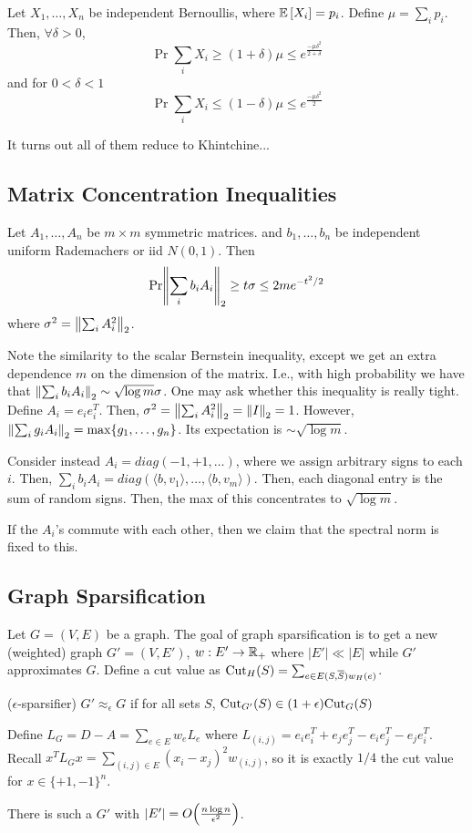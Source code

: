\begin{theorem}[Chernoff]
    Let $X_1, \dots, X_n$ be independent Bernoullis, where $\mathbb{E}\left[ X_i \right] = p_i$. Define $\mu = \sum_i p_i$.
    Then, $\forall \delta > 0$,
    \[ \Pr{\sum_i X_i \ge (1 + \delta) \mu} \le e^{\frac{-\mu\delta^2}{2 + \delta}} \]
    and for $0 < \delta < 1$
    \[ \Pr{\sum_i X_i \le (1 - \delta) \mu} \le e^{\frac{-\mu\delta^2}{2}} \]
\end{theorem}

It turns out all of them reduce to Khintchine...

\subsection{Matrix Concentration Inequalities}

\begin{theorem}
    Let $A_1, \dots, A_n$ be $m \times m$ symmetric matrices.
    and $b_1, \dots, b_n$ be independent uniform Rademachers or iid $N(0, 1)$.
    Then
    \[ \textrm{Pr}{\norm{\sum_i b_i A_i}_2 \ge t\sigma} \le 2me^{-t^2/2} \]
    where $\sigma^2 = \norm{\sum_i A_i^2}_2$.
\end{theorem}
Note the similarity to the scalar Bernstein inequality, except we get an extra dependence $m$
on the dimension of the matrix.
I.e., with high probability we have that $\norm{\sum_i b_i A_i}_2 \sim  \sqrt{\log m} \sigma$.
One may ask whether this inequality is really tight. Define $A_i = e_i e_i^T$. Then,
$\sigma^2 = \norm{\sum_i A_i^2}_2 = \norm{I}_2 = 1$. However, $\norm{\sum_i g_i A_i}_2 = \max\{g_1, \dots, g_n\}$.
Its expectation is $\sim \sqrt{\log m}$.

Consider instead $A_i = diag(-1, +1, \dots)$, where we assign arbitrary signs 
to each $i$. Then, $\sum_i b_i A_i = diag(\langle b, v_1\rangle, \dots, \langle b, v_m \rangle)$.
Then, each diagonal entry is the sum of random signs. Then, the max of this concentrates
to $\sqrt{\log m}$.

If the $A_i$'s commute with each other, then we claim that the spectral norm is fixed to this.

\subsection{Graph Sparsification}
Let $G = (V, E)$ be a graph. The goal of graph sparsification is to get a new (weighted) graph $G' = (V, E')$, $w: E' \to \operatorname{\mathbb{R}}_+$
where $|E'| \ll |E|$ while $G'$ approximates $G$. 
Define a cut value as $\textrm{Cut}_{H}(S) = \sum_{e \in E(S, \overline{S}) w_H(e)}$.
\begin{definition}($\epsilon$-sparsifier)
    $G' \approx_{\epsilon} G $ if for all sets $S$, $\textrm{Cut}_{G'}(S) \in (1 + \epsilon) \textrm{Cut}_{G}(S)$
\end{definition}
Define $L_G = D - A = \sum_{e \in E} w_e L_e$ where $L_{(i, j)} = e_i e_i^T + e_j e_j^T - e_i e_j^T - e_j e_i^T$.
Recall $x^T L_G x = \sum_{(i, j) \in E} (x_i - x_j)^2 w_{(i, j)}$, so it is exactly $1/4$ the cut value
for $x \in \{+1, -1\}^n$.
\begin{theorem}
    There is such a $G'$ with $|E'| = O\qty(\frac{n \log n}{\epsilon^2})$.
\end{theorem}

